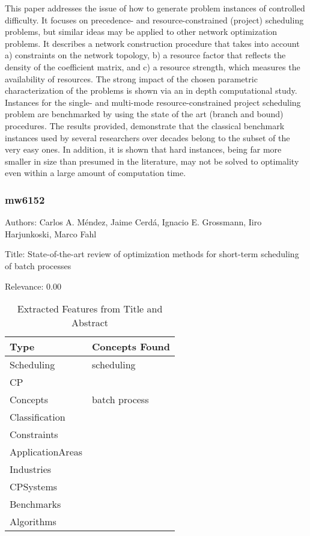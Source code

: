   This paper addresses the issue of how to generate problem instances of controlled difficulty. It focuses on precedence- and resource-constrained (project) scheduling problems, but similar ideas may be applied to other network optimization problems. It describes a network construction procedure that takes into account a) constraints on the network topology, b) a resource factor that reflects the density of the coefficient matrix, and c) a resource strength, which measures the availability of resources. The strong impact of the chosen parametric characterization of the problems is shown via an in depth computational study. Instances for the single- and multi-mode resource-constrained project scheduling problem are benchmarked by using the state of the art (branch and bound) procedures. The results provided, demonstrate that the classical benchmark instances used by several researchers over decades belong to the subset of the very easy ones. In addition, it is shown that hard instances, being far more smaller in size than presumed in the literature, may not be solved to optimality even within a large amount of computation time.  

\subsubsection{mw6152}
\label{mw:mw6152}

Authors: Carlos A. Méndez, Jaime Cerdá, Ignacio E. Grossmann, Iiro Harjunkoski, Marco Fahl

Title: State-of-the-art review of optimization methods for short-term scheduling of batch processes

Relevance:  0.00

{\scriptsize
\begin{longtable}{p{2cm}p{20cm}}
\caption{Extracted Features from Title and Abstract}\\ \toprule
Type & Concepts Found\\ \midrule
\endhead
\bottomrule
\endfoot
Scheduling & scheduling\\ 
CP & \\ 
Concepts & batch process\\ 
Classification & \\ 
Constraints & \\ 
ApplicationAreas & \\ 
Industries & \\ 
CPSystems & \\ 
Benchmarks & \\ 
Algorithms & \\ 
\end{longtable}
}




